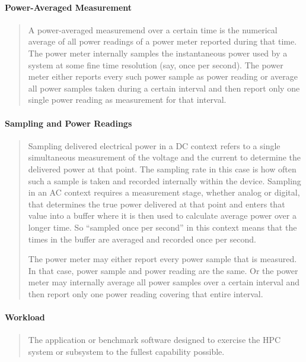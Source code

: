 \paragraph*{Power-Averaged Measurement}
\begin{quote}
A power-averaged measuremend over a certain time is the numerical average of all power readings of a power meter reported during that time.
The power meter internally samples the instantaneous power used by a system at some fine time resolution (say, once per second).
The power meter either reports every such power sample as power reading or average all power samples taken during a certain interval and then report only one single power reading as measurement for that interval.
\end{quote}

\paragraph*{Sampling and Power Readings}
\begin{quote}
Sampling delivered electrical power in a DC context refers to a single simultaneous measurement of the voltage and the current to determine the delivered power at that point.
The sampling rate in this case is how often such a sample is taken and recorded internally within the device.
Sampling in an AC context requires a measurement stage, whether analog or digital, that determines the true power delivered at that point and enters that value into a buffer where it is then used to calculate average power over a longer time.
So ``sampled once per second'' in this context means that the times in the buffer are averaged and recorded once per second.

The power meter may either report every power sample that is measured.
In that case, power sample and power reading are the same.
Or the power meter may internally average all power samples over a certain interval and then report only one power reading covering that entire interval.
\end{quote}

\paragraph*{Workload}
\begin{quote}
The application or benchmark software designed to exercise the HPC system or subsystem to
the fullest capability possible.
\end{quote}

